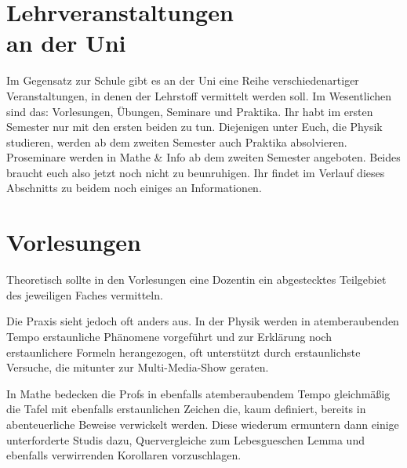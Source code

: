 \section[Lehrveranstaltungen an der Uni]{Lehrveranstaltungen \\an der Uni}

\begin{figure}[b]
\end{figure}

Im Gegensatz zur Schule gibt es an der Uni eine Reihe verschiedenartiger Veranstaltungen, in denen der Lehrstoff vermittelt werden soll. Im Wesentlichen sind das: Vorlesungen, Übungen, Seminare und Praktika. Ihr habt im ersten Semester nur mit den ersten beiden zu tun. Diejenigen unter Euch, die Physik studieren, werden ab dem zweiten Semester auch Praktika absolvieren. Proseminare werden in Mathe \& Info ab dem zweiten Semester angeboten. Beides braucht euch also jetzt noch nicht zu beunruhigen. Ihr findet im Verlauf dieses Abschnitts zu beidem noch einiges an Informationen.

\section{Vorlesungen}

Theoretisch sollte in den Vorlesungen eine Dozentin ein abgestecktes Teilgebiet des jeweiligen Faches vermitteln.

Die Praxis sieht jedoch oft anders aus. In der Physik werden in atemberaubenden Tempo erstaunliche Phänomene vorgeführt und zur Erklärung noch erstaunlichere Formeln herangezogen, oft unterstützt durch erstaunlichste Versuche, die mitunter zur Multi-Media-Show geraten.

In Mathe bedecken die Profs in ebenfalls atemberaubendem Tempo gleichmäßig die Tafel mit ebenfalls erstaunlichen Zeichen die, kaum definiert, bereits in abenteuerliche Beweise verwickelt werden. Diese wiederum ermuntern dann einige unterforderte Studis dazu, Quervergleiche zum Lebesgueschen Lemma und ebenfalls verwirrenden Korollaren vorzuschlagen.

